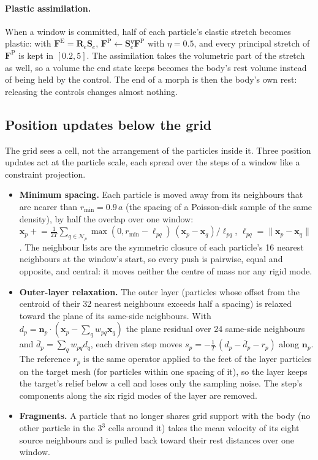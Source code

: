 \paragraph{Plastic assimilation.} When a window is committed, half of each particle's elastic stretch becomes
plastic: with $\mathbf{F}^{\mathrm{E}}=\mathbf{R}_e\mathbf{S}_e$,
$\mathbf{F}^{\mathrm{P}}\leftarrow\mathbf{S}_e^{\eta}\mathbf{F}^{\mathrm{P}}$ with $\eta=0.5$, and every principal
stretch of $\mathbf{F}^{\mathrm{P}}$ is kept in $[0.2,5]$. The assimilation takes the volumetric part of the stretch
as well, so a volume the end state keeps becomes the body's rest volume instead of being held by the control. The
end of a morph is then the body's own rest: releasing the controls changes almost nothing.

\subsection{Position updates below the grid}
\label{ch4:sec_below_grid}
The grid sees a cell, not the arrangement of the particles inside it. Three position updates act at the particle
scale, each spread over the steps of a window like a constraint projection.
\begin{itemize}
  \item \textbf{Minimum spacing.} Each particle is moved away from its neighbours that are nearer than
        $r_{\min}=0.9\,a$ (the spacing of a Poisson-disk sample of the same density), by half the overlap over one
        window:
        $\mathbf{x}_p\mathrel{+}=\tfrac{1}{2T}\sum_{q\in\mathcal{N}_p}\max(0,r_{\min}-\ell_{pq})\,
        (\mathbf{x}_p-\mathbf{x}_q)/\ell_{pq}$, $\ell_{pq}=\lVert\mathbf{x}_p-\mathbf{x}_q\rVert$.
        The neighbour lists are the symmetric closure of each particle's 16 nearest neighbours at the window's
        start, so every push is pairwise, equal and opposite, and central: it moves neither the centre of mass nor
        any rigid mode.
  \item \textbf{Outer-layer relaxation.} The outer layer (particles whose offset from the centroid of their 32
        nearest neighbours exceeds half a spacing) is relaxed toward the plane of its same-side neighbours. With
        $d_p=\mathbf{n}_p\cdot(\mathbf{x}_p-\sum_q w_{pq}\mathbf{x}_q)$ the plane residual over 24 same-side neighbours
        and $\bar d_p=\sum_q w_{pq}d_q$, each driven step moves
        $s_p=-\tfrac{1}{T}\,(d_p-\bar d_p-r_p)$ along $\mathbf{n}_p$. The reference $r_p$ is the same operator applied
        to the feet of the layer particles on the target mesh (for particles within one spacing of it), so the layer
        keeps the target's relief below a cell and loses only the sampling noise. The step's components along the six rigid modes of the layer are removed.
  \item \textbf{Fragments.} A particle that no longer shares grid support with the body (no other particle in the
        $3^3$ cells around it) takes the mean velocity of its eight source neighbours and is pulled back toward their
        rest distances over one window.
\end{itemize}
